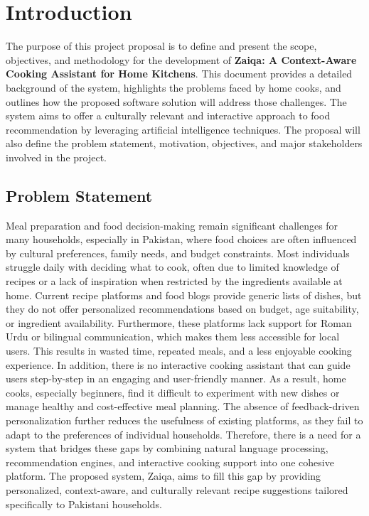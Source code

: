 \chapter{Introduction}
\label{sec:introduction}

The purpose of this project proposal is to define and present the scope, objectives, and methodology for the development of \textbf{Zaiqa: A Context-Aware Cooking Assistant for Home Kitchens}. This document provides a detailed background of the system, highlights the problems faced by home cooks, and outlines how the proposed software solution will address those challenges. The system aims to offer a culturally relevant and interactive approach to food recommendation by leveraging artificial intelligence techniques. The proposal will also define the problem statement, motivation, objectives, and major stakeholders involved in the project. \cite{test}

\section{Problem Statement}

Meal preparation and food decision-making remain significant challenges for many households, especially in Pakistan, where food choices are often influenced by cultural preferences, family needs, and budget constraints. Most individuals struggle daily with deciding what to cook, often due to limited knowledge of recipes or a lack of inspiration when restricted by the ingredients available at home. Current recipe platforms and food blogs provide generic lists of dishes, but they do not offer personalized recommendations based on budget, age suitability, or ingredient availability. Furthermore, these platforms lack support for Roman Urdu or bilingual communication, which makes them less accessible for local users. This results in wasted time, repeated meals, and a less enjoyable cooking experience. In addition, there is no interactive cooking assistant that can guide users step-by-step in an engaging and user-friendly manner. As a result, home cooks, especially beginners, find it difficult to experiment with new dishes or manage healthy and cost-effective meal planning. The absence of feedback-driven personalization further reduces the usefulness of existing platforms, as they fail to adapt to the preferences of individual households. Therefore, there is a need for a system that bridges these gaps by combining natural language processing, recommendation engines, and interactive cooking support into one cohesive platform. The proposed system, Zaiqa, aims to fill this gap by providing personalized, context-aware, and culturally relevant recipe suggestions tailored specifically to Pakistani households.

